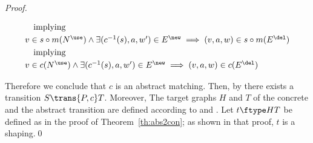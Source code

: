 \begin{proof}
\begin{enumerate}
\[\begin{array}{ll}
\quad\mbox{implying}
\\[\smallskipamount]
v \in s \circ m(N^\use) \wedge \exists (c^{-1}(s),a,w') \in E^\new
                \implies (v,a,w) \in s \circ m(E^\del)
\\[\smallskipamount]
\quad\mbox{implying}
\\[\smallskipamount]
v \in c(N^\use) \wedge \exists (c^{-1}(s),a,w') \in E^\new
                \implies (v,a,w) \in c(E^\del)
\end{array}
\]
\end{enumerate}
Therefore we conclude that $c$ is an abstract matching.
  Then, by  there
  exists a transition $S \trans{P,c} T$.  Moreover, The target graphs $H$ and
  $T$ of the concrete and the abstract transition are defined according to
   and .  Let $t\ftype H
  T$ be defined as in the proof of Theorem~\ref{th:abs2con}; as shown in that
  proof, $t$ is a shaping.\qed
\end{proof}

